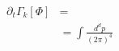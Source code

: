 \documentclass{article}
\begin{document}
\begin{align}
    \partial_t\Gamma_k[\Phi] &=\\
    &= \int\frac{d^d p}{(2\pi)^{4}}\frac{}{}
\end{align}
\end{document}
